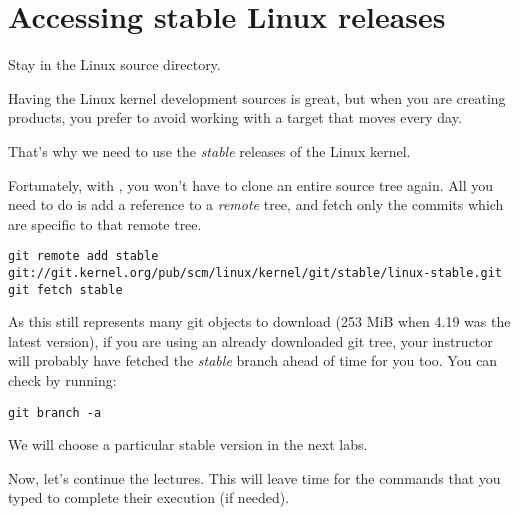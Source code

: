 \section{Accessing stable Linux releases}

Stay in the Linux source directory.

Having the Linux kernel development sources is great, but when you are
creating products, you prefer to avoid working with a target that moves
every day.

That's why we need to use the {\em stable} releases of the Linux
kernel.

Fortunately, with , you won't have to clone an entire source
tree again. All you need to do is add a reference to a {\em remote}
tree, and fetch only the commits which are specific to that remote tree.

{\small
\begin{verbatim}
git remote add stable git://git.kernel.org/pub/scm/linux/kernel/git/stable/linux-stable.git
git fetch stable
\end{verbatim}
}

As this still represents many git objects to download (253 MiB when 4.19 was
the latest version), if you are using an already downloaded git tree,
your instructor will probably have fetched the {\em stable} branch ahead
of time for you too. You can check by running:

\begin{verbatim}
git branch -a
\end{verbatim}

We will choose a particular stable version in the next labs.

Now, let's continue the lectures. This will leave time for the commands
that you typed to complete their execution (if needed).
